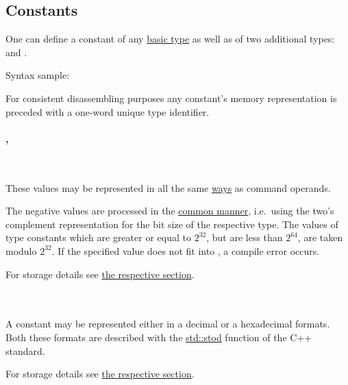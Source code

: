 \hypertarget{constants}{
    \subsection{Constants}
}

One can define a constant of any \hyperlink{types:basic}{basic type}
as well as of two additional types:  and .

Syntax sample: 

For consistent disassembling purposes any constant's memory representation
is preceded with a one-word unique type identifier.

\vspace{-0.35cm}
\paragraph{, }\

These values may be represented in all the same
\hyperlink{operand:representation}{ways} as command operands.

The negative values are processed in the \hyperlink{types:twos_complement}
{common manner}, i.e.\ using the two's complement representation for
the bit size of the respective type.
The values of  type constants which are greater or equal
to $2^{32}$, but are less than $2^{64}$, are taken modulo $2^{32}$.
If the specified value does not fit into , a compile error occurs.

For storage details see
\hyperlink{types:two_words_storage}{the respective section}.

\vspace{-0.35cm}
\paragraph{}\

A  constant may be represented either in a decimal or
a hexadecimal formats.
Both these formats are described with the
\href{https://en.cppreference.com/w/cpp/string/basic_string/stof}{std::stod}
function of the C++ standard.

For storage details see
\hyperlink{types:two_words_storage}{the respective section}.

\vspace{-0.35cm}
\paragraph{}\

